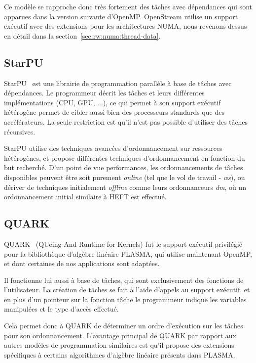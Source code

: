 Ce modèle se rapproche donc très fortement des tâches avec dépendances qui sont apparues dans la version suivante d'OpenMP.
OpenStream utilise un support exécutif avec des extensions pour les architectures NUMA, nous revenons dessus en détail dans la section~\ref{sec:rw:numa:thread-data}.

\subsection{StarPU}

StarPU~\cite{StarPU} est une librairie de programmation parallèle à base de tâches avec dépendances.
Le programmeur décrit les tâches et leurs différentes implémentations (CPU, GPU, ...), ce qui permet à son support exécutif hétérogène permet de cibler aussi bien des processeurs standards que des accélérateurs.
La seule restriction est qu'il n'est pas possible d'utiliser des tâches récursives.

StarPU utilise des techniques avancées d'ordonnancement sur ressources hétérogènes, et propose différentes techniques d'ordonnancement en fonction du but recherché.
D'un point de vue performances, les ordonnancements de tâches disponibles peuvent être soit purement \emph{online} (tel que le vol de travail - \emph{ws}), ou dériver de techniques initialement \emph{offline} comme leurs ordonnanceurs \emph{dm}, où un ordonnancement initial similaire à HEFT est effectué.

\subsection{QUARK}

QUARK~\cite{Kurzak2013} (QUeing And Runtime for Kernels) fut le support exécutif privilégié pour la bibliothèque d'algèbre linéaire PLASMA, qui utilise maintenant OpenMP, et dont certaines de nos applications sont adaptées.

Il fonctionne lui aussi à base de tâches, qui sont exclusivement des fonctions de l'utilisateur.
La création de tâches se fait à l'aide d'appels au support exécutif, et en plus d'un pointeur sur la fonction tâche le programmeur indique les variables manipulées et le type d'accès effectué.

Cela permet donc à QUARK de déterminer un ordre d'exécution sur les tâches pour son ordonnancement.
L'avantage principal de QUARK par rapport aux autres modèles de programmation similaires est qu'il propose des extensions spécifiques à certains algorithmes d'algèbre linéaire présents dans PLASMA.

